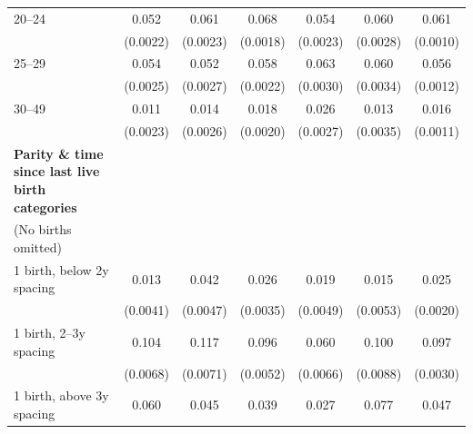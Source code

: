 {\begin{tabular}{l*{6}{c}}
\addlinespace
\hspace*{1em}20–24               &       0.052\sym{**}&       0.061\sym{**}&       0.068\sym{**}&       0.054\sym{**}&       0.060\sym{**}&       0.061\sym{**}\\
                    &    (0.0022)        &    (0.0023)        &    (0.0018)        &    (0.0023)        &    (0.0028)        &    (0.0010)        \\
\addlinespace
\hspace*{1em}25–29               &       0.054\sym{**}&       0.052\sym{**}&       0.058\sym{**}&       0.063\sym{**}&       0.060\sym{**}&       0.056\sym{**}\\
                    &    (0.0025)        &    (0.0027)        &    (0.0022)        &    (0.0030)        &    (0.0034)        &    (0.0012)        \\
\addlinespace
\hspace*{1em}30–49               &       0.011\sym{**}&       0.014\sym{**}&       0.018\sym{**}&       0.026\sym{**}&       0.013\sym{**}&       0.016\sym{**}\\
                    &    (0.0023)        &    (0.0026)        &    (0.0020)        &    (0.0027)        &    (0.0035)        &    (0.0011)        \\
\addlinespace
\textbf{Parity \& time since last live birth categories} \\ (No births omitted)&                    &                    &                    &                    &                    &                    \\
\addlinespace
\hspace*{1em}1 birth, below 2y spacing&       0.013\sym{**}&       0.042\sym{**}&       0.026\sym{**}&       0.019\sym{**}&       0.015\sym{**}&       0.025\sym{**}\\
                    &    (0.0041)        &    (0.0047)        &    (0.0035)        &    (0.0049)        &    (0.0053)        &    (0.0020)        \\
\addlinespace
\hspace*{1em}1 birth, 2–3y spacing&       0.104\sym{**}&       0.117\sym{**}&       0.096\sym{**}&       0.060\sym{**}&       0.100\sym{**}&       0.097\sym{**}\\
                    &    (0.0068)        &    (0.0071)        &    (0.0052)        &    (0.0066)        &    (0.0088)        &    (0.0030)        \\
\addlinespace
\hspace*{1em}1 birth, above 3y spacing&       0.060\sym{**}&       0.045\sym{**}&       0.039\sym{**}&       0.027\sym{**}&       0.077\sym{**}&       0.047\sym{**}\\

\end{tabular}}
